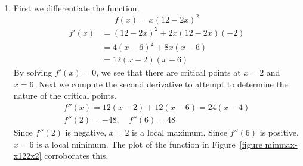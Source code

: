 


\begin{Solution}
  \label{solution max min x(12-2x)2}
  \renewcommand{\theenumi}{\alph{enumi}}
  \begin{enumerate}
  \item
    First we differentiate the function.
    \[
    f(x) = x (12 - 2 x)^2
    \]
    \begin{align*}
      f'(x)
      &= (12 - 2 x)^2 + 2 x (12 - 2 x) (-2) 
      \\
      &= 4 (x - 6)^2 + 8 x (x - 6) 
      \\
      &= 12 (x - 2)(x - 6)
    \end{align*}
    By solving $f'(x) = 0$, we see that there are critical points at 
    $x = 2$ and $x = 6$.  Next we compute the second derivative to attempt
    to determine the nature of the critical points.
    \begin{gather*}
      f''(x) = 12 (x - 2) + 12 (x - 6) = 24 (x - 4)
      \\
      f''(2) = - 48, \quad f''(6) = 48
    \end{gather*}
    Since $f''(2)$ is negative, $x = 2$ is a local maximum. 
    Since $f''(6)$ is positive, $x = 6$ is a local minimum. 
    The plot of the function in Figure~\ref{figure minmax-x122x2} corroborates
    this.


\end{enumerate}
\end{Solution}
